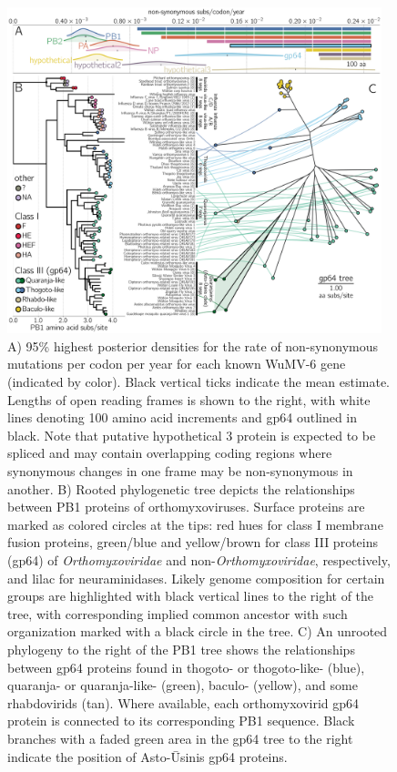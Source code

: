 \documentclass[11pt]{article}
\begin{document}
\begin{figure}%
\centering
\includegraphics[width=0.97\textwidth]{Fig2_protein-trees.pdf}
\caption{
A) 95\% highest posterior densities for the rate of non-synonymous mutations per codon per year for each known WuMV-6 gene (indicated by color).
Black vertical ticks indicate the mean estimate.
Lengths of open reading frames is shown to the right, with white lines denoting 100 amino acid increments and gp64 outlined in black.
Note that putative hypothetical 3 protein is expected to be spliced \citep{batson_single_2021} and may contain overlapping coding regions where synonymous changes in one frame may be non-synonymous in another.
B) Rooted phylogenetic tree depicts the relationships between PB1 proteins of orthomyxoviruses.
Surface proteins are marked as colored circles at the tips: red hues for class I membrane fusion proteins, green/blue and yellow/brown for class III proteins (gp64) of \textit{Orthomyxoviridae} and non-\textit{Orthomyxoviridae}, respectively, and lilac for neuraminidases.
Likely genome composition for certain groups are highlighted with black vertical lines to the right of the tree, with corresponding implied common ancestor with such organization marked with a black circle in the tree.
C) An unrooted phylogeny to the right of the PB1 tree shows the relationships between gp64 proteins found in thogoto- or thogoto-like- (blue), quaranja- or quaranja-like- (green), baculo- (yellow), and some rhabdovirids (tan).
Where available, each orthomyxovirid gp64 protein is connected to its corresponding PB1 sequence.
Black branches with a faded green area in the gp64 tree to the right indicate the position of Asto-\={U}sinis gp64 proteins.
}
\label{fig:orthomyxos}

\end{figure}
\end{document}
